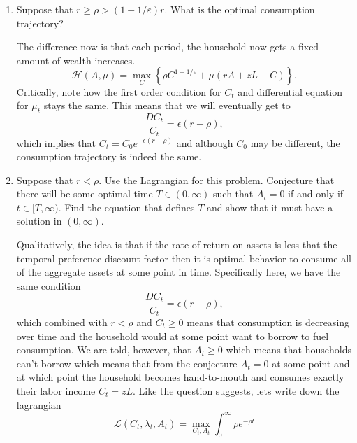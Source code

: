 \documentclass[11pt,english]{article}
\begin{document}
\begin{enumerate}[label = (\alph*)]
\item  Suppose that $r \geq \rho > (1 - 1/\varepsilon)r$. What is the optimal consumption trajectory?
\begin{solution}
The difference now is that each period, the household now gets a fixed amount of wealth increases. 
$$\mathcal{H}(A, \mu) = \max_{C}\left\{\rho C^{1 - 1/\epsilon} + \mu(rA  + zL- C)\right\}.$$
Critically, note how the first order condition for $C_t$ and differential equation for $\mu_t$ stays the same. This means that we will eventually get to $$\frac{DC_t}{C_t} = \epsilon(r - \rho),$$which implies that $C_t = C_0 e^{-\epsilon(r - \rho)}$ and although $C_0$ may be different, the consumption trajectory is indeed the same.
\end{solution}
\item Suppose that $r < \rho$. Use the Lagrangian for this problem. Conjecture that there will be
some optimal time $T \in (0, \infty)$ such that $A_t = 0$ if and only if $t \in [T, \infty)$. Find the equation
that defines $T$ and show that it must have a solution in $(0, \infty)$.
\begin{solution}
Qualitatively, the idea is that if the rate of return on assets is less that the temporal preference discount factor then it is optimal behavior to consume all of the aggregate assets at some point in time. Specifically here, we have the same condition $$\frac{DC_t}{C_t} = \epsilon(r - \rho),$$ which combined with $r < \rho$ and $C_t \geq 0$ means that consumption is decreasing over time and the household would at some point want to borrow to fuel consumption. We are told, however, that $A_t \geq 0$ which means that households can't borrow which means that from the conjecture $A_t = 0$ at some point and at which point the household becomes hand-to-mouth and consumes exactly their labor income $C_t = zL$. Like the question suggests, lets write down the lagrangian $$\mathcal{L}(C_t, \lambda_t, A_t) = \max_{C_t, A_t} \int_0^\infty \rho e^{-\rho t}$$
\end{solution}
\end{enumerate}
\end{document}
